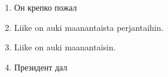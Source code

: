 \documentclass[paper=a4, fontsize=11pt]{scrartcl}
\begin{document}
\begin{enumerate}
    \underline{\hspace{12cm}}
    \item Он крепко пожал 
    \item Liike on auki maanantaista perjantaihin. \\
    \underline{\hspace{12cm}}
    \item Liike on auki maanantaisin. \\
    \underline{\hspace{12cm}}
    \item Президент дал 
\end{enumerate}
\end{document}

